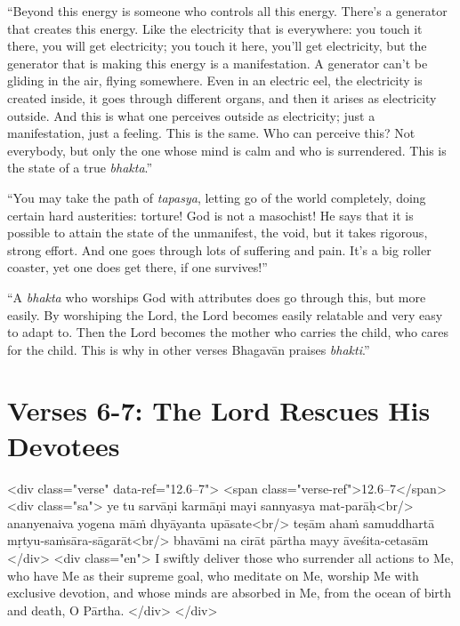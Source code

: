 \enquote{Beyond this energy is someone who controls all this energy. There’s a generator that creates this energy. Like the electricity that is everywhere: you touch it there, you will get electricity; you touch it here, you’ll get electricity, but the generator that is making this energy is a manifestation. A generator can’t be gliding in the air, flying somewhere. Even in an electric eel, the electricity is created inside, it goes through different organs, and then it arises as electricity outside. And this is what one perceives outside as electricity; just a manifestation, just a feeling. This is the same. Who can perceive this? Not everybody, but only the one whose mind is calm and who is surrendered. This is the state of a true \textit{bhakta}.}

\enquote{You may take the path of \textit{tapasya}, letting go of the world completely, doing certain hard austerities: torture! God is not a masochist! He says that it is possible to attain the state of the unmanifest, the void, but it takes rigorous, strong effort. And one goes through lots of suffering and pain. It’s a big roller coaster, yet one does get there, if one survives!}

\enquote{A \textit{bhakta} who worships God with attributes does go through this, but more easily. By worshiping the Lord, the Lord becomes easily relatable and very easy to adapt to. Then the Lord becomes the mother who carries the child, who cares for the child. This is why in other verses Bhagavān praises \textit{bhakti}.}

\newpage
\section{Verses 6-7: The Lord Rescues His Devotees}\label{sec-verses-6-7-the-lord-rescues-his-devotees}


\begin{html}
<div class="verse" data-ref="12.6–7">
  <span class="verse-ref">12.6–7</span>
  <div class="sa">
    ye tu sarvāṇi karmāṇi mayi sannyasya mat-parāḥ<br/>
    ananyenaiva yogena māṁ dhyāyanta upāsate<br/>
    teṣām ahaṁ samuddhartā mṛtyu-saṁsāra-sāgarāt<br/>
    bhavāmi na cirāt pārtha mayy āveśita-cetasām
  </div>
  <div class="en">
    I swiftly deliver those who surrender all actions to Me, who have Me as their supreme goal, who meditate on Me, worship Me with exclusive devotion, and whose minds are absorbed in Me, from the ocean of birth and death, O Pārtha.
  </div>
</div>
\end{html}


